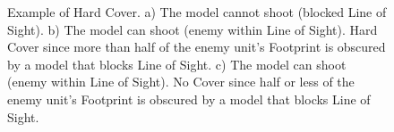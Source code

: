 \newcommand{\figureHCSizeGreen}{\normalfontsize{Size: Standard}}
\newcommand{\figureHCSizeBlue}{\normalfontsize{Size: Standard}}
\newcommand{\figureHCSizePurple}{\normalfontsize{Size: Standard}}
\newcommand{\figureHCNotwithinlightofsight}{%
\begin{minipage}{0.08\unitlength}\begin{center}%
\smallfontsize{Not within Line of Sight}%
\end{center}\end{minipage}%
}
\newcommand{\figureHCWithinlightofsight}{\smallfontsize{Within Line of Sight}}
\newcommand{\figureHCLessthanhalfoffootprintobscured}{%
\begin{minipage}{0.08\unitlength}\begin{center}%
\smallfontsize{Less than half of Footprint obscured}%
\end{center}\end{minipage}%
}
\newcommand{\figureHCMorethanhalfoffootprintobscured}{%
\begin{minipage}{0.08\unitlength}\begin{center}%
\smallfontsize{More than half of Footprint obscured}%
\end{center}\end{minipage}%
}

\begin{figure}[!htbp]
\centering
\def\svgwidth{\textwidth}

\caption{Example of Hard Cover.\captionpar
a) The model cannot shoot (blocked Line of Sight).\captionpar
b) The model can shoot (enemy within Line of Sight). Hard Cover since more than half of the enemy unit's Footprint is obscured by a model that blocks Line of Sight.\captionpar
c) The model can shoot (enemy within Line of Sight). No Cover since half or less of the enemy unit's Footprint is obscured by a model that blocks Line of Sight.}
\label{figure/hard_cover}
\end{figure}

\newcommand{\figureSHCSizeGreen}{\normalfontsize{Size: Large}}
\newcommand{\figureSHCSizeBlue}{\normalfontsize{Size: Standard}}
\newcommand{\figureSHCSizePurple}{\normalfontsize{Size: Standard}}
\newcommand{\figureSHCLessthanhalffromhardcover}{\normalfontsize{Less than half of Footprint in Hard Cover}}
\newcommand{\figureSHCLessthanhalffromsoftcover}{%
\begin{minipage}{0.3\unitlength}\begin{center}%
\normalfontsize{Less than half of Footprint in Soft Cover}%
\end{center}\end{minipage}%
}
\newcommand{\figureSHCMorethanhalftotal}{\normalfontsize{{More than half total}}}

